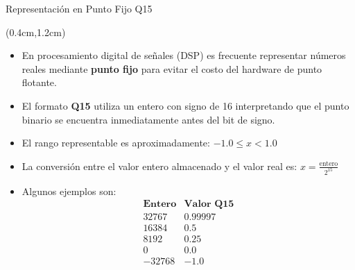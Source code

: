 \begin{frame}{Representación en Punto Fijo Q15}
 \begin{textblock*}{\textwidth}(0.4cm,1.2cm)
   \begin{itemize}[<+->]\justifying
    \item En procesamiento digital de señales (DSP) es frecuente representar números reales mediante \textbf{punto fijo} para evitar el costo del hardware de punto flotante.
    \item El formato \textbf{Q15} utiliza un entero con signo de \SI{16}{\bit} interpretando que el punto binario se encuentra inmediatamente antes del bit de signo.
    \item El rango representable es aproximadamente: $-1.0 \le x < 1.0$
    \item La conversión entre el valor entero almacenado y el valor real es:
    $x=\frac{\text{entero}}{2^{15}}$
    \item Algunos ejemplos son:
    \[
     \begin{array}{c|c}
      \textbf{Entero} & \textbf{Valor Q15} \\
      \hline
      32767 & 0.99997 \\
      16384 & 0.5 \\
      8192  & 0.25 \\
      0     & 0.0 \\
      -32768 & -1.0
     \end{array}
    \]
   \end{itemize}
 \end{textblock*}
\end{frame}

